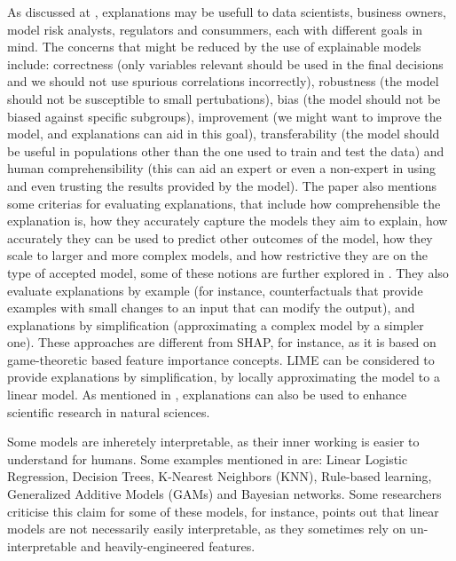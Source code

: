 As discussed at \cite{belle2021principles}, explanations may be usefull to data scientists, business owners, model risk analysts, regulators and consummers, each with different goals in mind. The concerns that might be reduced by the use of explainable models include: correctness (only variables relevant should be used in the final decisions and we should not use spurious correlations incorrectly), robustness (the model should not be susceptible to small pertubations), bias (the model should not be biased against specific subgroups), improvement (we might want to improve the model, and explanations can aid in this goal), transferability (the model should be useful in populations other than the one used to train and test the data) and human comprehensibility (this can aid an expert or even a non-expert in using and even trusting the results provided by the model). The paper also mentions some criterias for evaluating explanations, that include how comprehensible the explanation is, how they accurately capture the models they aim to explain, how accurately they can be used to predict other outcomes of the model, how they scale to larger and more complex models, and how restrictive they are on the type of accepted model, some of these notions are further explored in \cite{carvalho2019machine}. They also evaluate explanations by example (for instance, counterfactuals \cite{verma2020counterfactual} that provide examples with small changes to an input that can modify the output), and explanations by simplification (approximating a complex model by a simpler one). These approaches are different from SHAP, for instance, as it is based on game-theoretic based feature importance concepts. LIME can be considered to provide explanations by simplification, by locally approximating the model to a linear model. As mentioned in \cite{roscher2020explainable}, explanations can also be used to enhance scientific research in natural sciences.

Some models are inheretely interpretable, as their inner working is easier to understand for humans. Some examples mentioned in \cite{belle2021principles} are: Linear Logistic Regression, Decision Trees, K-Nearest Neighbors (KNN), Rule-based learning, Generalized Additive Models (GAMs) and Bayesian networks. Some researchers criticise this claim for some of these models, for instance, \cite{lipton2018mythos} points out that linear models are not necessarily easily interpretable, as they sometimes rely on un-interpretable and heavily-engineered features.

